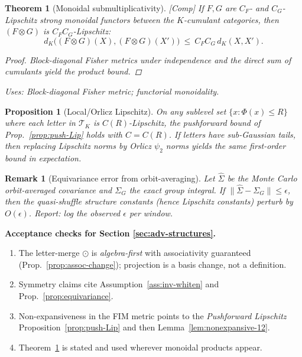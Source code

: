 \documentclass[10pt]{article}
\newcommand{\uses}[1]{\par\smallskip\noindent\textit{Uses: }#1\par\smallskip}
\newtheorem{theorem}{Theorem}
\newtheorem{proposition}{Proposition}
\newtheorem{remark}{Remark}
\begin{document}
\begin{theorem}[Monoidal submultiplicativity]\label{thm:monoidal-4}
\emph{[\textup{Comp}]}
If $F,G$ are $C_F$- and $C_G$-Lipschitz strong monoidal functors between the $K$-cumulant categories, then $(F\otimes G)$ is $C_FC_G$-Lipschitz:
\[
d_K\big((F\otimes G)(X),(F\otimes G)(X')\big)\ \le\ C_FC_G\, d_K(X,X').
\]
\begin{proof}
Block-diagonal Fisher metrics under independence and the direct sum of cumulants yield the product bound.
\end{proof}
\uses{Block-diagonal Fisher metric; functorial monoidality.}
\end{theorem}

\begin{proposition}[Local/Orlicz Lipschitz]\label{prop:local-orlicz}
On any sublevel set $\{x:\Phi(x)\le R\}$ where each letter in $\mathcal T_K$ is $C(R)$-Lipschitz, 
the pushforward bound of Prop.~\ref{prop:push-Lip} holds with $C\!=\!C(R)$. 
If letters have sub-Gaussian tails, then replacing Lipschitz norms by Orlicz $\psi_2$ norms yields the same first-order bound in expectation.
\end{proposition}

\begin{remark}[Equivariance error from orbit-averaging]\label{rem:whiten-error}
Let $\widehat\Sigma$ be the Monte Carlo orbit-averaged covariance and $\Sigma_G$ the exact group integral. If $\|\widehat\Sigma-\Sigma_G\|\le \epsilon$, then the quasi-shuffle structure constants (hence Lipschitz constants) perturb by $O(\epsilon)$. 
\emph{Report:} log the observed $\epsilon$ per window.
\end{remark}

\begin{mdframed}
\textbf{Acceptance checks for Section \ref{sec:adv-structures}.}
\begin{enumerate}[leftmargin=*]
\item The letter-merge $\odot$ is \emph{algebra-first} with associativity guaranteed (Prop.~\ref{prop:assoc-change}); projection is a basis change, not a definition.
\item Symmetry claims cite Assumption~\ref{ass:inv-whiten} and Prop.~\ref{prop:equivariance}.
\item Non-expansiveness in the FIM metric points to the \emph{Pushforward Lipschitz} Proposition~\ref{prop:push-Lip} and then Lemma~\ref{lem:nonexpansive-12}.
\item Theorem~\ref{thm:monoidal-4} is stated and used wherever monoidal products appear.
\end{enumerate}
\end{mdframed}
\end{document}
